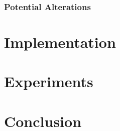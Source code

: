\documentclass[12pt]{report}
\begin{document}
\subsection{Potential Alterations}  %

\chapter{Implementation}

\chapter{Experiments}

\chapter{Conclusion}
\end{document}
